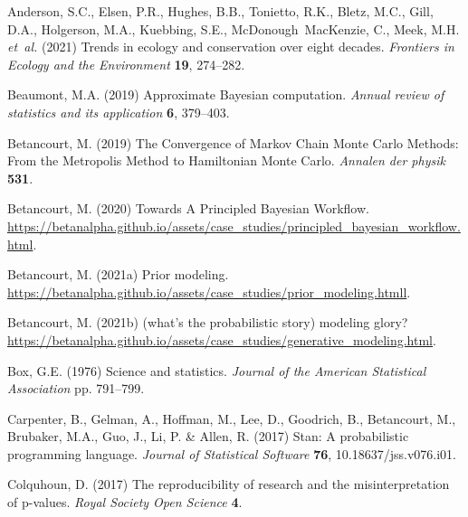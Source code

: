 \documentclass[11pt]{article}
\begin{document}
\newpage
\vspace{-5ex}
\begin{thebibliography}{35}
\providecommand{\natexlab}[1]{#1}

Anderson, S.C., Elsen, P.R., Hughes, B.B., Tonietto, R.K., Bletz, M.C., Gill,
  D.A., Holgerson, M.A., Kuebbing, S.E., McDonough~MacKenzie, C., Meek, M.H.
  \emph{et~al.} (2021) Trends in ecology and conservation over eight decades.
  \emph{Frontiers in Ecology and the Environment} \textbf{19}, 274--282.

Beaumont, M.A. (2019) {Approximate Bayesian computation}. \emph{Annual review
  of statistics and its application} \textbf{6}, 379--403.

Betancourt, M. (2019) {The Convergence of Markov Chain Monte Carlo Methods:
  From the Metropolis Method to Hamiltonian Monte Carlo}. \emph{Annalen der
  physik} \textbf{531}.

Betancourt, M. (2020) {Towards A Principled Bayesian Workflow}.
  \url{https://betanalpha.github.io/assets/case_studies/principled_bayesian_workflow.html}.

\bibitem[{Betancourt(2021{\natexlab{a}})}]{betanprior}
Betancourt, M. (2021{\natexlab{a}}) Prior modeling.
  \url{https://betanalpha.github.io/assets/case_studies/prior_modeling.htmll}.

\bibitem[{Betancourt(2021{\natexlab{b}})}]{betangen}
Betancourt, M. (2021{\natexlab{b}}) (what's the probabilistic story) modeling
  glory?
  \url{https://betanalpha.github.io/assets/case_studies/generative_modeling.html}.

Box, G.E. (1976) Science and statistics. \emph{Journal of the American
  Statistical Association} pp. 791--799.

Carpenter, B., Gelman, A., Hoffman, M., Lee, D., Goodrich, B., Betancourt, M.,
  Brubaker, M.A., Guo, J., Li, P. \& Allen, R. (2017) Stan: A probabilistic
  programming language. \emph{Journal of Statistical Software} \textbf{76},
  10.18637/jss.v076.i01.

Colquhoun, D. (2017) The reproducibility of research and the misinterpretation
  of p-values. \emph{Royal Society Open Science} \textbf{4}.


\end{thebibliography}
\end{document}
